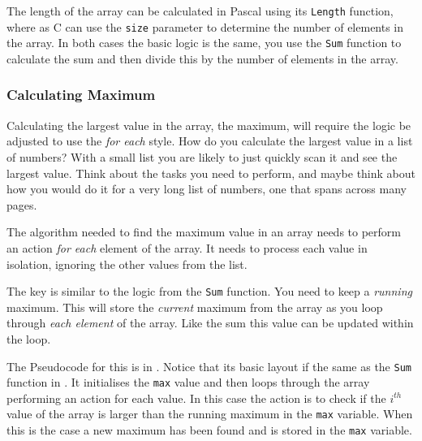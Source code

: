 The length of the array can be calculated in Pascal using its \texttt{Length} function, where as C can use the \texttt{size} parameter to determine the number of elements in the array. In both cases the basic logic is the same, you use the \texttt{Sum} function to calculate the sum and then divide this by the number of elements in the array.





\clearpage
\subsubsection{Calculating Maximum} %
\label{ssub:calculating_maximum}

Calculating the largest value in the array, the maximum, will require the logic be adjusted to use the \emph{for each} style. How do you calculate the largest value in a list of numbers? With a small list you are likely to just quickly scan it and see the largest value. Think about the tasks you need to perform, and maybe think about how you would do it for a very long list of numbers, one that spans across many pages.

The algorithm needed to find the maximum value in an array needs to perform an action \emph{for each} element of the array. It needs to process each value in isolation, ignoring the other values from the list.

The key is similar to the logic from the \texttt{Sum} function. You need to keep a \emph{running} maximum. This will store the \emph{current} maximum from the array as you loop through \emph{each element} of the array. Like the sum this value can be updated within the loop.

The Pseudocode for this is in . Notice that its basic layout if the same as the \texttt{Sum} function in . It initialises the \texttt{max} value and then loops through the array performing an action for each value. In this case the action is to check if the $i^{th}$ value of the array is larger than the running maximum in the \texttt{max} variable. When this is the case a new maximum has been found and is stored in the \texttt{max} variable.

